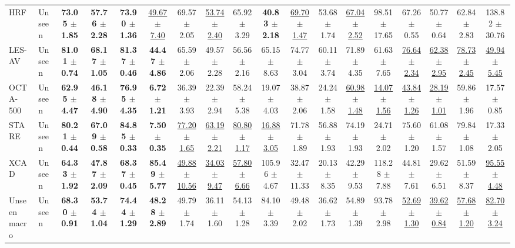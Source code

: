 \begin{table}[t]
{\begin{tabular}{llcccc|cccc|cccc|cccc}
HRF & Unseen & \textbf{73.05 $\pm$ 1.85} & \textbf{57.76 $\pm$ 2.28} & \textbf{73.90 $\pm$ 1.36} & \underline{49.67 $\pm$ 7.40} & 69.57 $\pm$ 2.05 & \underline{53.74 $\pm$ 2.40} & 65.92 $\pm$ 3.29 & \textbf{40.83 $\pm$ 2.18} & \underline{69.70 $\pm$ 1.47} & 53.68 $\pm$ 1.74 & \underline{67.04 $\pm$ 2.52} & 98.51 $\pm$ 17.65 & 67.26 $\pm$ 0.55 & 50.77 $\pm$ 0.64 & 62.84 $\pm$ 2.83 & 138.82 $\pm$ 30.76 \\
LES-AV & Unseen & \textbf{81.01 $\pm$ 0.74} & \textbf{68.17 $\pm$ 1.05} & \textbf{81.37 $\pm$ 0.46} & \textbf{44.47 $\pm$ 4.86} & 65.59 $\pm$ 2.06 & 49.57 $\pm$ 2.28 & 56.56 $\pm$ 2.16 & 65.15 $\pm$ 8.63 & 74.77 $\pm$ 3.04 & 60.11 $\pm$ 3.74 & 71.89 $\pm$ 4.35 & 61.63 $\pm$ 7.65 & \underline{76.64 $\pm$ 2.34} & \underline{62.38 $\pm$ 2.95} & \underline{78.73 $\pm$ 2.45} & \underline{49.94 $\pm$ 5.45} \\
OCTA-500 & Unseen & \textbf{62.95 $\pm$ 4.47} & \textbf{46.18 $\pm$ 4.90} & \textbf{76.95 $\pm$ 4.35} & \textbf{6.72 $\pm$ 1.21} & 36.39 $\pm$ 3.93 & 22.39 $\pm$ 2.94 & 58.24 $\pm$ 5.38 & 19.07 $\pm$ 4.03 & 38.87 $\pm$ 2.06 & 24.24 $\pm$ 1.58 & \underline{60.98 $\pm$ 1.48} & \underline{14.07 $\pm$ 1.56} & \underline{43.84 $\pm$ 1.26} & \underline{28.19 $\pm$ 1.01} & 59.86 $\pm$ 1.96 & 17.57 $\pm$ 0.85 \\
STARE & Unseen & \textbf{80.21 $\pm$ 0.44} & \textbf{67.09 $\pm$ 0.58} & \textbf{84.85 $\pm$ 0.33} & \textbf{7.50 $\pm$ 0.35} & \underline{77.20 $\pm$ 1.65} & \underline{63.19 $\pm$ 2.21} & \underline{80.80 $\pm$ 1.17} & \underline{16.88 $\pm$ 3.05} & 71.78 $\pm$ 1.89 & 56.88 $\pm$ 1.93 & 74.19 $\pm$ 1.93 & 24.71 $\pm$ 2.02 & 75.60 $\pm$ 1.20 & 61.08 $\pm$ 1.57 & 79.84 $\pm$ 1.08 & 17.33 $\pm$ 2.05 \\
XCAD & Unseen & \textbf{64.33 $\pm$ 1.92} & \textbf{47.87 $\pm$ 2.09} & \textbf{68.37 $\pm$ 0.45} & \textbf{85.49 $\pm$ 5.77} & \underline{49.88 $\pm$ 10.56} & \underline{34.03 $\pm$ 9.47} & \underline{57.80 $\pm$ 6.66} & 105.96 $\pm$ 4.67 & 32.47 $\pm$ 11.33 & 20.13 $\pm$ 8.35 & 42.29 $\pm$ 9.53 & 118.28 $\pm$ 7.88 & 44.81 $\pm$ 7.61 & 29.62 $\pm$ 6.51 & 51.59 $\pm$ 8.37 & \underline{95.55 $\pm$ 4.48} \\
\midrule
Unseen macro & Unseen & \textbf{68.30 $\pm$ 0.91} & \textbf{53.74 $\pm$ 1.04} & \textbf{74.44 $\pm$ 1.29} & \textbf{48.28 $\pm$ 2.89} & 49.79 $\pm$ 1.74 & 36.11 $\pm$ 1.60 & 54.13 $\pm$ 1.28 & 84.10 $\pm$ 3.39 & 49.48 $\pm$ 2.02 & 36.62 $\pm$ 1.73 & 54.89 $\pm$ 1.39 & 93.78 $\pm$ 2.98 & \underline{52.69 $\pm$ 1.30} & \underline{39.62 $\pm$ 0.84} & \underline{57.68 $\pm$ 1.20} & \underline{82.70 $\pm$ 3.24} \\

\end{tabular}}
\end{table}
